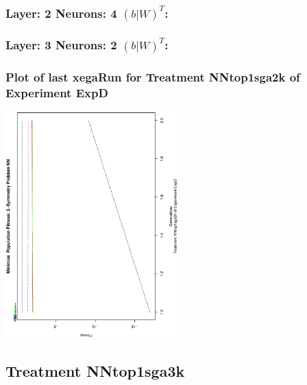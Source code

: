 \documentclass[18pt,c]{beamer}
\makeatletter
\def\beamer@writeslidentry@miniframesoff{%
  \expandafter\beamer@ifempty\expandafter{\beamer@framestartpage}{}%
  {%
   \clearpage\beamer@notesactions%
  }
}
\newcommand*{\miniframesoff}{\let\beamer@writeslidentry=\beamer@writeslidentry@miniframesoff}
\makeatother
\begin{document}

 \begin{frame}
 \fontsize{8pt}{9pt}\selectfont
 \frametitle{ Layer: 2 Neurons: 4  $(b|W)^T$: 
 }

 \label{ExpDNNWeightTable001.tex}  
 \end{frame}


 \begin{frame}
 \fontsize{8pt}{9pt}\selectfont
 \frametitle{ Layer: 3 Neurons: 2  $(b|W)^T$: 
 }

 \label{ExpDNNWeightTable002.tex}  
 \end{frame}

 \begin{frame}
 \frametitle{ Plot of last xegaRun for Treatment NNtop1sga2k of Experiment ExpD }
 \begin{center}
\includegraphics[width=0.5\textwidth, angle=-90]
{ExpDPlotPopStatsFigure000.eps}
 \end{center}
 \label{report/ExpDPlotPopStatsFigure000.eps}  
 \end{frame}

\miniframesoff
\subsection{Treatment NNtop1sga3k}
\end{document}
